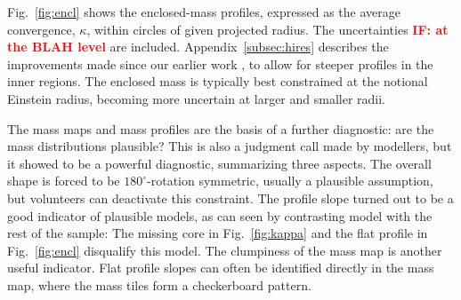 Fig.~\ref{fig:encl} shows the enclosed-mass profiles, expressed as the
average convergence, $\kappa$, within circles of given projected
radius.  The uncertainties \textcolor{red}{\bf IF: at the BLAH level}
are included.  Appendix~\ref{subsec:hires} describes the improvements made
since our earlier work \citep{2015MNRAS.447.2170K}, to allow for
steeper profiles in the inner regions.  The enclosed mass is typically
best constrained at the notional Einstein radius, becoming more
uncertain at larger and smaller radii.

The mass maps and mass profiles are the basis of a further diagnostic:
are the mass distributions plausible? This is also a judgment call
made by modellers, but it showed to be a powerful diagnostic,
summarizing three aspects. The overall shape is forced to be
$180^\circ$-rotation symmetric, usually a plausible assumption, but
volunteers can deactivate this constraint. The profile slope turned
out to be a good indicator of plausible models, as can seen by
contrasting model  with the rest of the sample:  The missing
core in Fig.~\ref{fig:kappa} and the flat profile in
Fig.~\ref{fig:encl} disqualify this model. The clumpiness of the
mass map is another useful indicator. Flat profile slopes can often be
identified directly in the mass map, where the mass tiles form a
checkerboard pattern.


